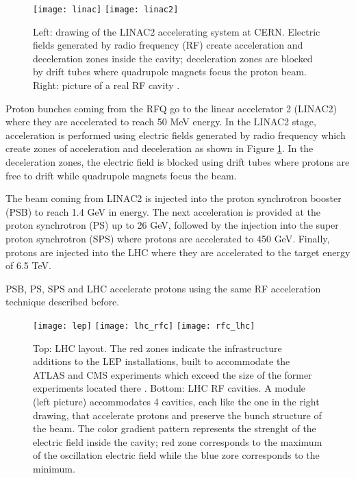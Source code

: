 \begin{figure}[!h]
  \centering
  \texttt{[image: linac]}
  \texttt{[image: linac2]}
  \caption [The LINAC2 accelerating system at CERN.]{ Left: drawing of the LINAC2 accelerating system at CERN. Electric fields generated by radio frequency (RF) create acceleration and deceleration zones inside the cavity; deceleration zones are blocked by drift tubes where quadrupole magnets focus the proton beam. Right: picture of a real RF cavity \cite{linac}.}\label{fig:linac}
\end{figure}

Proton bunches coming from the RFQ go to the linear accelerator 2 (LINAC2) where they are accelerated to reach 50 MeV energy. In the LINAC2 stage, acceleration is performed using electric fields generated by radio frequency which create zones of acceleration and deceleration as shown in Figure \ref{fig:linac}. In the deceleration zones, the electric field is blocked using drift tubes where protons are free to drift while quadrupole magnets focus the beam.   

The beam coming from LINAC2 is injected into the proton synchrotron booster (PSB) to reach 1.4 GeV in energy. The next acceleration is provided at the proton synchrotron (PS) up to 26 GeV, followed by the injection into the super proton synchrotron (SPS) where protons are accelerated to 450 GeV. Finally, protons are injected into the LHC where they are accelerated to the target energy of 6.5 TeV.

PSB, PS, SPS and LHC accelerate protons using the same RF acceleration technique described before. 

\begin{figure}[!h]
\centering
\texttt{[image: lep]}
\texttt{[image: lhc\_rfc]}
\texttt{[image: rfc\_lhc]}
\caption[LHC layout and RF cavities module.]{Top: LHC layout. The red zones indicate the infrastructure additions to the LEP installations, built to accommodate the ATLAS and CMS experiments which exceed the size of the former experiments located there \cite{lep}. Bottom: LHC RF cavities. A module (left picture) accommodates 4 cavities, each like the one in the right drawing, that accelerate protons and preserve the bunch structure of the beam. The color gradient pattern represents the strenght of the electric field inside the cavity; red zone corresponds to the maximum of the oscillation electric field while the blue zore corresponds to the minimum.\cite{video,lhc_rfc}}\label{fig:lep_rfc}
\end{figure}


